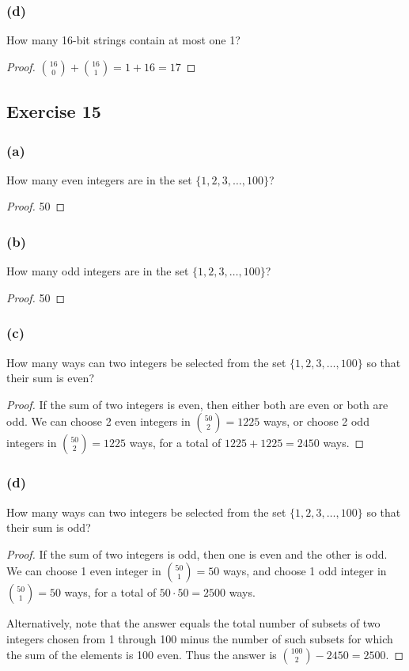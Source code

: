 \documentclass[14pt]{extarticle}
\begin{document}
\subsubsection{(d)}
How many 16-bit strings contain at most one 1?

\begin{proof}
\(\binom{16}{0} + \binom{16}{1} = 1 + 16 = 17\)
\end{proof}

\subsection{Exercise 15}
\subsubsection{(a)}
How many even integers are in the set \(\{1, 2, 3, \ldots, 100\}\)?

\begin{proof}
50
\end{proof}

\subsubsection{(b)}
How many odd integers are in the set \(\{1, 2, 3, \ldots, 100\}\)?

\begin{proof}
50
\end{proof}

\subsubsection{(c)}
How many ways can two integers be selected from the set \(\{1, 2, 3, \ldots, 100\}\) so that their sum is even?

\begin{proof}
If the sum of two integers is even, then either both are even or both are odd. We can choose 2 even integers in \(\binom{50}
{2} = 1225\) ways, or choose 2 odd integers in \(\binom{50}{2}= 1225\) ways, for a total of \(1225 + 1225 = 2450\) ways.
\end{proof}

\subsubsection{(d)}
How many ways can two integers be selected from the set \(\{1, 2, 3, \ldots, 100\}\) so that their sum is odd?

\begin{proof}
If the sum of two integers is odd, then one is even and the other is odd. We can choose 1 even integer in \(\binom{50}{1}
= 50\) ways, and choose 1 odd integer in \(\binom{50}{1} = 50\) ways, for a total of \(50 \cdot 50 = 2500\) ways.

Alternatively, note that the answer equals the total number of subsets of two integers chosen from 1 through 100 minus the number of such subsets for which the sum of the elements is 100 even. Thus the answer is \(\binom{100}{2} - 2450 = 2500\).
\end{proof}
\end{document}
